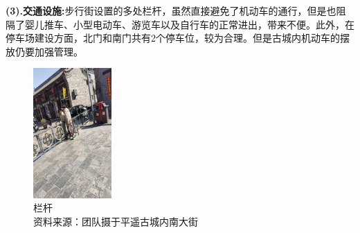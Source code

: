 \documentclass[UTF8]{ctexart}
\begin{document}
\textbf{(3).交通设施:}步行街设置的多处栏杆，虽然直接避免了机动车的通行，但是也阻隔了婴儿推车、小型电动车、游览车以及自行车的正常进出，带来不便。此外，在停车场建设方面，北门和南门共有2个停车位，较为合理。但是古城内机动车的摆放仍要加强管理。
\begin{figure}[H]
    \centering
    \includegraphics[width=3cm]{图片 10.png}
    \caption[plain]{栏杆\\资料来源：团队摄于平遥古城内南大街}
    \label{fig:my_label}
\end{figure}
\end{document}
